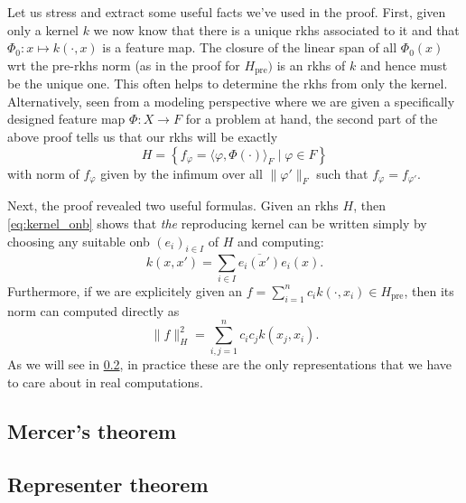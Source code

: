 
Let us stress and extract some useful facts we've used in the proof.
First, given only a kernel $k$ we now know that there is a unique rkhs
associated to it and that $\Phi_0 \colon x \mapsto k(\cdot,x)$ is a 
feature map.
The closure of the linear span of all $\Phi_0(x)$ wrt the 
pre-rkhs norm (as in the proof for $H_{\textrm{pre}})$ is 
an rkhs of $k$ and hence must be the unique one.
This often helps to determine the rkhs from only the kernel.
Alternatively, seen from a modeling perspective where
we are given a specifically designed feature 
map $\Phi \colon X \to F$ for a problem at hand, 
the second part of the above proof tells us that our
rkhs will be exactly
\begin{equation*}
    H = \left\{ f_\varphi = \langle \varphi,\Phi(\cdot) \rangle_F 
    \mid \varphi \in F \right\}
\end{equation*}
with norm of $f_\varphi$ given by the infimum over all $\|\varphi'\|_F$
such that $f_\varphi = f_{\varphi'}$.

Next, the proof revealed two useful formulas.
Given an rkhs $H$, then \cref{eq:kernel_onb} shows that \emph{the} 
reproducing kernel can be written simply by choosing any suitable onb 
$(e_i)_{i \in I}$ of $H$ and computing:
\begin{equation*}
    k(x,x') = \sum_{i \in I} \overline{e_i(x')} e_i(x).
\end{equation*}
Furthermore, if we are explicitely given an 
$f = \sum_{i=1}^n c_i k(\cdot,x_i) \in H_{\textrm{pre}}$,
then its norm can computed directly as 
\begin{equation*}
    \| f \|^2_H = \sum_{i,j = 1}^n c_i c_j k(x_j,x_i).
\end{equation*}
As we will see in \cref{subsection:representer_theorem}, 
in practice these are the only representations that we have to care 
about in real computations.

\subsection{Mercer's theorem}

\subsection{Representer theorem}
\label{subsection:representer_theorem}

